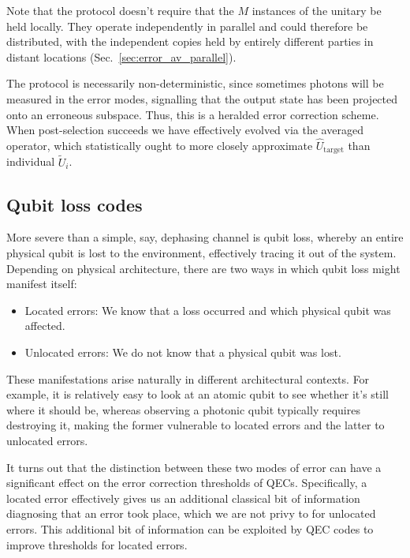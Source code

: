 Note that the protocol doesn't require that the $M$ instances of the unitary be held locally. They operate independently in parallel and could therefore be distributed, with the independent copies held by entirely different parties in distant locations (Sec.~\ref{sec:error_av_parallel}).

The protocol is necessarily non-deterministic, since sometimes photons will be measured in the error modes, signalling that the output state has been projected onto an erroneous subspace. Thus, this is a heralded error correction scheme. When post-selection succeeds we have effectively evolved via the averaged operator, which statistically ought to more closely approximate $\hat{U}_\mathrm{target}$ than individual $\tilde{U}_i$.

%
%

\subsection{Qubit loss codes}

More severe than a simple, say, dephasing channel is qubit loss, whereby an entire physical qubit is lost to the environment, effectively tracing it out of the system. Depending on physical architecture, there are two ways in which qubit loss might manifest itself:
\begin{itemize}
\item Located errors: We know that a loss occurred and which physical qubit was affected.
\item Unlocated errors: We do not know that a physical qubit was lost.
\end{itemize}

These manifestations arise naturally in different architectural contexts. For example, it is relatively easy to look at an atomic qubit to see whether it's still where it should be, whereas observing a photonic qubit typically requires destroying it, making the former vulnerable to located errors and the latter to unlocated errors.

It turns out that the distinction between these two modes of error can have a significant effect on the error correction thresholds of QECs. Specifically, a located error effectively gives us an additional classical bit of information diagnosing that an error took place, which we are not privy to for unlocated errors. This additional bit of information can be exploited by QEC codes to improve thresholds for located errors.

